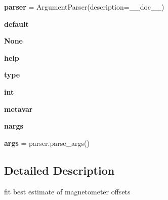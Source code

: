 \begin{DoxyCompactItemize}
\item 
\mbox{\label{namespacepymavlink_1_1tools_1_1mavfft_aeefff5b5d4586e2de038a7784d8290e3}} 
{\bfseries parser} = Argument\+Parser(description=\+\_\+\+\_\+doc\+\_\+\+\_\+)
\item 
\mbox{\label{namespacepymavlink_1_1tools_1_1mavfft_a176dc3b4a930e040a54e857135ae89ef}} 
{\bfseries default}
\item 
\mbox{\label{namespacepymavlink_1_1tools_1_1mavfft_ac2776f5146774e469684227be65af80b}} 
{\bfseries None}
\item 
\mbox{\label{namespacepymavlink_1_1tools_1_1mavfft_afe1d8f6eb1ecd9475d12b961a1484eb8}} 
{\bfseries help}
\item 
\mbox{\label{namespacepymavlink_1_1tools_1_1mavfft_a488028bdac60da515403f7272fb00ccc}} 
{\bfseries type}
\item 
\mbox{\label{namespacepymavlink_1_1tools_1_1mavfft_aeef12cf59f3d58e410d27fe77d9a881a}} 
{\bfseries int}
\item 
\mbox{\label{namespacepymavlink_1_1tools_1_1mavfft_acb7ef77f6da41e5c1bf7f0fe4c5af8c8}} 
{\bfseries metavar}
\item 
\mbox{\label{namespacepymavlink_1_1tools_1_1mavfft_a910befdb642f7224a1886250308b87d4}} 
{\bfseries nargs}
\item 
\mbox{\label{namespacepymavlink_1_1tools_1_1mavfft_ae74b1a50e94b5c998151033eb2d6879a}} 
{\bfseries args} = parser.\+parse\+\_\+args()
\end{DoxyCompactItemize}


\subsection{Detailed Description}
\begin{DoxyVerb}fit best estimate of magnetometer offsets
\end{DoxyVerb}
 


